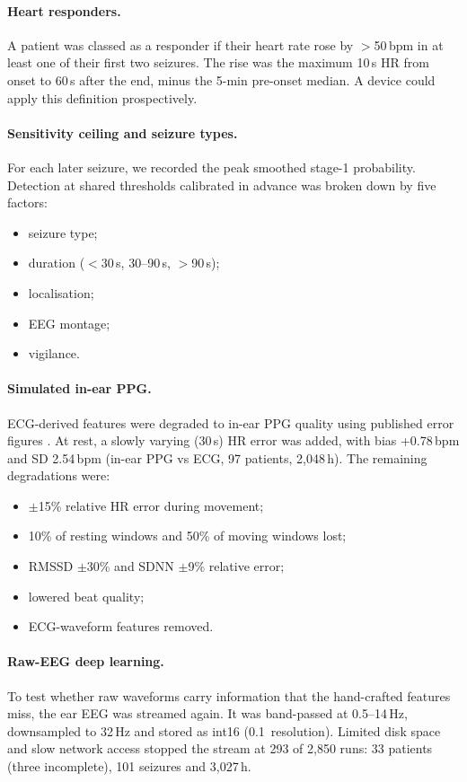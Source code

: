 \paragraph{Heart responders.} A patient was classed as a responder if their heart rate rose by $>$50\,bpm in at least one of their first two seizures. The rise was the maximum 10\,s HR from onset to 60\,s after the end, minus the 5-min pre-onset median. A device could apply this definition prospectively.

\paragraph{Sensitivity ceiling and seizure types.} For each later seizure, we recorded the peak smoothed stage-1 probability. Detection at shared thresholds calibrated in advance was broken down by five factors:
\begin{itemize}
\item seizure type;
\item duration ($<$30\,s, 30--90\,s, $>$90\,s);
\item localisation;
\item EEG montage;
\item vigilance.
\end{itemize}

\paragraph{Simulated in-ear PPG.} ECG-derived features were degraded to in-ear PPG quality using published error figures \cite{inear2022,prv2021}. At rest, a slowly varying (30\,s) HR error was added, with bias +0.78\,bpm and SD 2.54\,bpm (in-ear PPG vs ECG, 97 patients, 2,048\,h). The remaining degradations were:
\begin{itemize}
\item $\pm$15\% relative HR error during movement;
\item 10\% of resting windows and 50\% of moving windows lost;
\item RMSSD $\pm$30\% and SDNN $\pm$9\% relative error;
\item lowered beat quality;
\item ECG-waveform features removed.
\end{itemize}

\paragraph{Raw-EEG deep learning.} To test whether raw waveforms carry information that the hand-crafted features miss, the ear EEG was streamed again. It was band-passed at 0.5--14\,Hz, downsampled to 32\,Hz and stored as int16 (0.1\,\uV{} resolution). Limited disk space and slow network access stopped the stream at 293 of 2,850 runs: 33 patients (three incomplete), 101 seizures and 3,027\,h.

